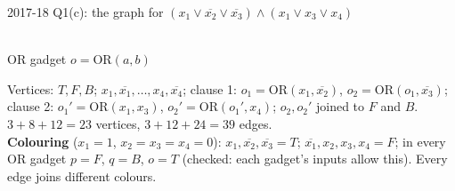 \documentclass[10.5pt,a4paper]{article}
\begin{document}
\begin{ans}{2017-18 Q1(c): the graph for $(x_1\vee\overline{x_2}\vee\overline{x_3})\wedge(x_1\vee x_3\vee x_4)$}
\begin{minipage}{0.47\linewidth}\centering
{}\\{\footnotesize OR gadget $o=\mathrm{OR}(a,b)$}
\end{minipage}\hfill
\begin{minipage}{0.5\linewidth}\footnotesize
Vertices: $T,F,B$; $x_1,\overline{x_1},\dots,x_4,\overline{x_4}$; clause 1: $o_1=\mathrm{OR}(x_1,\overline{x_2})$, $o_2=\mathrm{OR}(o_1,\overline{x_3})$;
clause 2: $o_1'=\mathrm{OR}(x_1,x_3)$, $o_2'=\mathrm{OR}(o_1',x_4)$; $o_2,o_2'$ joined to $F$ and $B$. $3+8+12=23$ vertices, $3+12+24=39$ edges.\\
\textbf{Colouring} ($x_1=1$, $x_2=x_3=x_4=0$): $x_1,\overline{x_2},\overline{x_3}=T$; $\overline{x_1},x_2,x_3,x_4=F$; in every OR gadget
$p=F$, $q=B$, $o=T$ (checked: each gadget's inputs allow this). Every edge joins different colours.
\end{minipage}
\end{ans}
\end{document}
